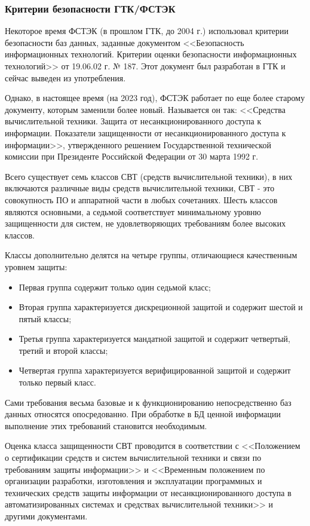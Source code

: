\subsubsection{Критерии безопасности ГТК/ФСТЭК}

Некоторое время ФСТЭК (в прошлом ГТК, до 2004 г.) использовал критерии безопасности баз данных, заданные документом <<Безопасность информационных технологий. Критерии оценки безопасности информационных технологий>> от 19.06.02 г. № 187. Этот документ был разработан в ГТК и сейчас выведен из употребления. \cite{GTK187}

Однако, в настоящее время (на 2023 год), ФСТЭК работает по еще более старому документу, которым заменили более новый.  Называется он так:
<<Средства вычислительной техники. Защита от несанкционированного доступа к информации. Показатели защищенности от несанкционированного доступа к информации>>, утвержденного решением Государственной технической комиссии при Президенте Российской Федерации от 30 марта 1992 г. \cite{GTK_1992}

Всего существует семь классов СВТ (средств вычислительной техники), в них включаются различные виды средств вычислительной техники, СВТ - это совокупность ПО и аппаратной части в любых сочетаниях. Шесть классов являются основными, а седьмой соответствует минимальному уровню защищенности для систем, не удовлетворяющих требованиям более высоких классов.

Классы дополнительно делятся на четыре группы, отличающиеся качественным уровнем защиты:
\begin{itemize}
	\item Первая группа содержит только один седьмой класс;
	\item Вторая группа характеризуется дискреционной защитой и содержит шестой и пятый классы;
	\item Третья группа характеризуется мандатной защитой и содержит четвертый, третий и второй классы;
	\item Четвертая группа характеризуется верифицированной защитой и содержит только первый класс.
\end{itemize}

Сами требования весьма базовые и к функционированию непосредственно баз данных относятся опосредованно. При обработке в БД ценной информации выполнение этих требований становится необходимым.

Оценка класса защищенности СВТ проводится в соответствии с
<<Положением о сертификации средств и систем вычислительной техники и связи по требованиям защиты информации>> и <<Временным положением по организации разработки, изготовления и эксплуатации программных и технических средств защиты информации от несанкционированного доступа в автоматизированных системах и средствах вычислительной техники>> и другими документами.

